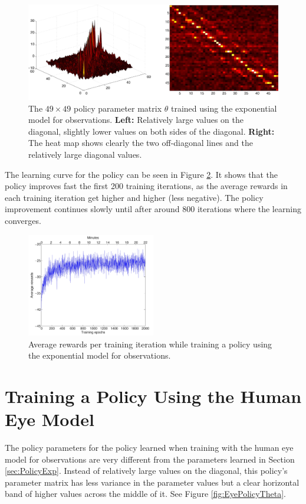 \begin{figure}[!htp]
  \centering
  \includegraphics[width=1\textwidth]{figures/exp_policy_theta}
  \caption{The $49 \times 49$ policy parameter matrix $\theta$ trained using the exponential model for observations. \textbf{Left:} Relatively large values on the diagonal, slightly lower values on both sides of the diagonal. \textbf{Right:} The heat map shows clearly the two off-diagonal lines and the relatively large diagonal values.}
  \label{fig:ExpPolicyTheta}
\end{figure}
\FloatBarrier

\noindent
The learning curve for the policy can be seen in Figure \ref{fig:AverageRewardsExp}. It shows that the policy improves fast the first 200 training iterations, as the average rewards in each training iteration get higher and higher (less negative). The policy improvement continues slowly until after around 800 iterations where the learning converges.

\begin{figure}[!htp]
  \centering
  \includegraphics[width=0.5\textwidth]{figures/average_rewards_exp_2x}
  \caption{Average rewards per training iteration while training a policy using the exponential model for observations.}
  \label{fig:AverageRewardsExp}
\end{figure}

\section{Training a Policy Using the Human Eye Model}
The policy parameters for the policy learned when training with the human eye model for observations are very different from the parameters learned in Section \ref{sec:PolicyExp}. Instead of relatively large values on the diagonal, this policy's parameter matrix has less variance in the parameter values but a clear horizontal band of higher values across the middle of it. See Figure \ref{fig:EyePolicyTheta}.


